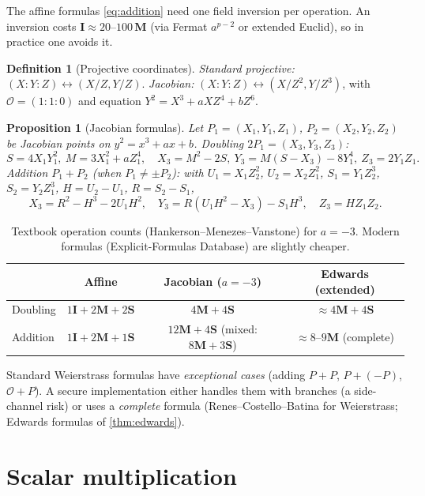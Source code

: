 \documentclass[11pt,a4paper,oneside]{book}
\theoremstyle{plain}
\newtheorem{proposition}[theorem]{Proposition}
\theoremstyle{definition}
\newtheorem{definition}[theorem]{Definition}
\theoremstyle{remark}
\newcommand{\Oinf}{\mathcal{O}}
\newcommand{\Mul}{\mathbf{M}}
\newcommand{\Sqr}{\mathbf{S}}
\newcommand{\Inv}{\mathbf{I}}
\begin{document}
The affine formulas \eqref{eq:addition} need one field inversion per operation. An inversion costs $\Inv\approx 20\text{--}100\,\Mul$ (via Fermat $a^{p-2}$ or extended Euclid), so in practice one avoids it.

\begin{definition}[Projective coordinates]
\emph{Standard projective:} $(X:Y:Z)\leftrightarrow(X/Z,Y/Z)$. \emph{Jacobian:} $(X:Y:Z)\leftrightarrow(X/Z^2,Y/Z^3)$, with $\Oinf=(1:1:0)$ and equation $Y^2=X^3+aXZ^4+bZ^6$.
\end{definition}

\begin{proposition}[Jacobian formulas]\label{prop:jacobian}
Let $P_1=(X_1,Y_1,Z_1)$, $P_2=(X_2,Y_2,Z_2)$ be Jacobian points on $y^2=x^3+ax+b$.
\emph{Doubling} $2P_1=(X_3,Y_3,Z_3)$:
\[
S=4X_1Y_1^2,\ M=3X_1^2+aZ_1^4,\quad X_3=M^2-2S,\ Y_3=M(S-X_3)-8Y_1^4,\ Z_3=2Y_1Z_1.
\]
\emph{Addition} $P_1+P_2$ (when $P_1\neq\pm P_2$): with $U_1=X_1Z_2^2$, $U_2=X_2Z_1^2$, $S_1=Y_1Z_2^3$, $S_2=Y_2Z_1^3$, $H=U_2-U_1$, $R=S_2-S_1$,
\[
X_3=R^2-H^3-2U_1H^2,\quad Y_3=R(U_1H^2-X_3)-S_1H^3,\quad Z_3=HZ_1Z_2.
\]
\end{proposition}

\begin{table}[ht]
\centering\small
\caption{Textbook operation counts (Hankerson--Menezes--Vanstone) for $a=-3$. Modern formulas (Explicit-Formulas Database) are slightly cheaper.}
\begin{tabular}{@{}lccc@{}}
\toprule
 & Affine & Jacobian ($a=-3$) & Edwards (extended)\\
\midrule
Doubling & $1\Inv+2\Mul+2\Sqr$ & $4\Mul+4\Sqr$ & $\approx 4\Mul+4\Sqr$\\
Addition & $1\Inv+2\Mul+1\Sqr$ & $12\Mul+4\Sqr$ (mixed: $8\Mul+3\Sqr$) & $\approx 8$--$9\Mul$ (complete)\\
\bottomrule
\end{tabular}
\end{table}

\begin{warningbox}
Standard Weierstrass formulas have \emph{exceptional cases} (adding $P+P$, $P+(-P)$, $\Oinf+P$). A secure implementation either handles them with branches (a side-channel risk) or uses a \emph{complete} formula (Renes--Costello--Batina for Weierstrass; Edwards formulas of \cref{thm:edwards}).
\end{warningbox}

\section{Scalar multiplication}\label{sec:scalar}
\end{document}
